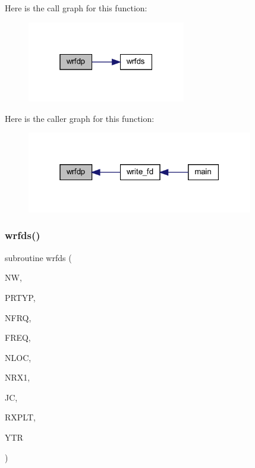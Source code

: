 Here is the call graph for this function\+:
\nopagebreak
\begin{figure}[H]
\begin{center}
\leavevmode
\includegraphics[width=196pt]{Marco_8f90_a325ce1448f0d02be280b64103f3b4793_cgraph}
\end{center}
\end{figure}
Here is the caller graph for this function\+:
\nopagebreak
\begin{figure}[H]
\begin{center}
\leavevmode
\includegraphics[width=280pt]{Marco_8f90_a325ce1448f0d02be280b64103f3b4793_icgraph}
\end{center}
\end{figure}
\mbox{\label{Marco_8f90_a9de61739c99930796cb75809668c8f06}} 
\subsubsection{\texorpdfstring{wrfds()}{wrfds()}}
{\footnotesize\ttfamily subroutine wrfds (\begin{DoxyParamCaption}\item[{integer}]{NW,  }\item[{integer}]{P\+R\+T\+YP,  }\item[{integer}]{N\+F\+RQ,  }\item[{real, dimension(nfrq)}]{F\+R\+EQ,  }\item[{integer}]{N\+L\+OC,  }\item[{integer}]{N\+R\+X1,  }\item[{integer}]{JC,  }\item[{real(kind=8), dimension(3,nloc)}]{R\+X\+P\+LT,  }\item[{real, dimension(nfrq,nloc)}]{Y\+TR }\end{DoxyParamCaption})}

